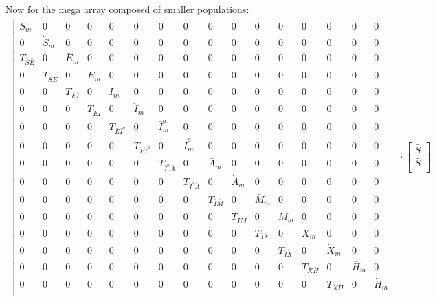 \documentclass[notitlepage, superscriptaddress]{revtex4-2}
\begin{document}
Now for the mega array composed of smaller populations:
\begin{eqnarray}
\begin{bmatrix}
\bar{S}_{m} & 0 & 0 & 0 & 0 & 0 & 0 & 0 & 0 & 0 & 0 & 0 & 0 & 0 & 0 & 0 \\ 
0 & \dot{S}_{m} & 0 & 0 & 0 & 0 & 0 & 0 & 0 & 0 & 0 & 0 & 0 & 0 & 0 & 0 \\ 
T_{\bar{S}\bar{E}} & 0 & \bar{E}_{m} & 0 & 0 & 0 & 0 & 0 & 0 & 0 & 0 & 0 & 0 & 0 & 0 & 0 \\ 
0 & T_{\dot{S}\dot{E}} & 0 & \dot{E}_{m} & 0 & 0 & 0 & 0 & 0 & 0 & 0 & 0 & 0 & 0 & 0 & 0 \\ 
0 & 0 & T_{\bar{E}\bar{I}} & 0 & \bar{I}_{m} & 0 & 0 & 0 & 0 & 0 & 0 & 0 & 0 & 0 & 0 & 0 \\ 
0 & 0 & 0 & T_{\dot{E}\dot{I}} & 0 & \dot{I}_{m} & 0 & 0 & 0 & 0 & 0 & 0 & 0 & 0 & 0 & 0 \\ 
0 & 0 & 0 & 0 & T_{\bar{E}\bar{I}^{a}} & 0 & \bar{I}^{a}_{m} & 0 & 0 & 0 & 0 & 0 & 0 & 0 & 0 & 0 \\ 
0 & 0 & 0 & 0 & 0 & T_{\dot{E}\dot{I}^{a}} & 0 & \dot{I}^{a}_{m} & 0 & 0 & 0 & 0 & 0 & 0 & 0 & 0 \\ 
0 & 0 & 0 & 0 & 0 & 0 & T_{\bar{I}^{a}\bar{A}} & 0 & \bar{A}_{m} & 0 & 0 & 0 & 0 & 0 & 0 & 0 \\ 
0 & 0 & 0 & 0 & 0 & 0 & 0 & T_{\dot{I}^{a}\dot{A}} & 0 & \dot{A}_{m} & 0 & 0 & 0 & 0 & 0 & 0 \\ 
0 & 0 & 0 & 0 & 0 & 0 & 0 & 0 & T_{\bar{I}\bar{M}} & 0 & \bar{M}_{m} & 0 & 0 & 0 & 0 & 0 \\ 
0 & 0 & 0 & 0 & 0 & 0 & 0 & 0 & 0 & T_{\dot{I}\dot{M}} & 0 & \dot{M}_{m} & 0 & 0 & 0 & 0 \\ 
0 & 0 & 0 & 0 & 0 & 0 & 0 & 0 & 0 & 0 & T_{\bar{I}\bar{X}} & 0 & \bar{X}_{m} & 0 & 0 & 0 \\ 
0 & 0 & 0 & 0 & 0 & 0 & 0 & 0 & 0 & 0 & 0 & T_{\dot{I}\dot{X}} & 0 & \dot{X}_{m} & 0 & 0 \\ 
0 & 0 & 0 & 0 & 0 & 0 & 0 & 0 & 0 & 0 & 0 & 0 & T_{\bar{X}\bar{H}} & 0 & \bar{H}_{m} & 0 \\ 
0 & 0 & 0 & 0 & 0 & 0 & 0 & 0 & 0 & 0 & 0 & 0 & 0 & T_{\dot{X}\dot{H}} & 0 & \dot{H}_{m} \\ 
\end{bmatrix}
%
\cdot
\begin{bmatrix}
\bar{S} \\
\bar{S} \\

\end{bmatrix}
\end{eqnarray}
\end{document}
